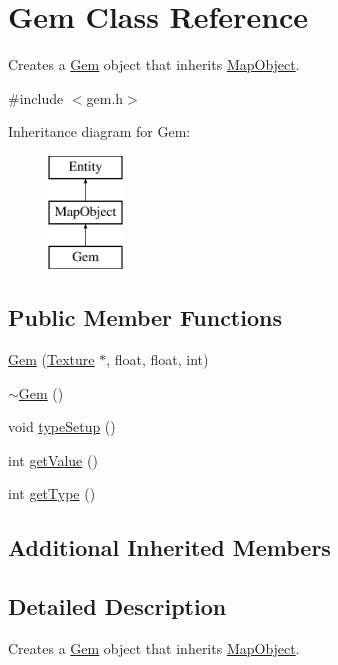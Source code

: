 \hypertarget{class_gem}{\section{Gem Class Reference}
\label{class_gem}
}


Creates a \hyperlink{class_gem}{Gem} object that inherits \hyperlink{class_map_object}{Map\+Object}.  




{\ttfamily \#include $<$gem.\+h$>$}

Inheritance diagram for Gem\+:\begin{figure}[H]
\begin{center}
\leavevmode
\includegraphics[height=3.000000cm]{class_gem}
\end{center}
\end{figure}
\subsection*{Public Member Functions}
\begin{DoxyCompactItemize}
\item 
\hyperlink{class_gem_a9b964b4eacf579f4e9fa2e6006222ca4}{Gem} (\hyperlink{class_texture}{Texture} $\ast$, float, float, int)
\item 
\hyperlink{class_gem_a25c24193733a5c4b9c230e4164b08cd4}{$\sim$\+Gem} ()
\item 
void \hyperlink{class_gem_a5b88637e9b62fc71af306f58f5c82cef}{type\+Setup} ()
\item 
int \hyperlink{class_gem_acccf14e79a3e6a9db263081e88e953e1}{get\+Value} ()
\item 
int \hyperlink{class_gem_afee29c071abd184ecaa5eb8925066691}{get\+Type} ()
\end{DoxyCompactItemize}
\subsection*{Additional Inherited Members}


\subsection{Detailed Description}
Creates a \hyperlink{class_gem}{Gem} object that inherits \hyperlink{class_map_object}{Map\+Object}. 

